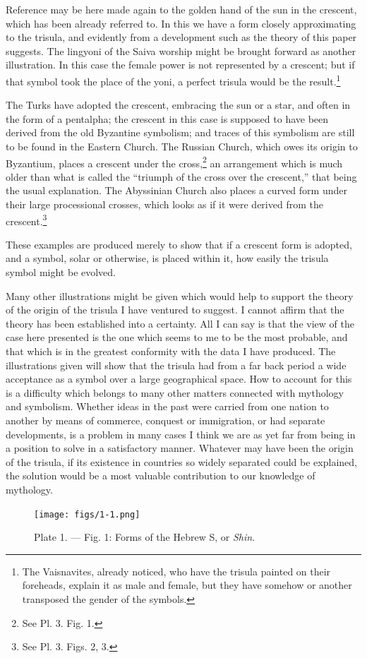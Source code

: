 \documentclass[a4paper, 11pt, oneside, english, landscape, twocolumn]{article}
\begin{document}
Reference may be here made again to the golden hand of the sun in the crescent, which has been already referred to. In this we have a form closely approximating to the trisula, and evidently from a development such as the theory of this paper suggests. The lingyoni of the Saiva worship might be brought forward as another illustration. In this case the female power is not represented by a crescent; but if that symbol took the place of the yoni, a perfect trisula would be the result.\footnote{The Vaisnavites, already noticed, who have the trisula painted on their foreheads, explain it as male and female, but they have somehow or another transposed the gender of the symbols.}

The Turks have adopted the crescent, embracing the sun or a star, and often in the form of a pentalpha; the crescent in this case is supposed to have been derived from the old Byzantine symbolism; and traces of this symbolism are still to be found in the Eastern Church. The Russian Church, which owes its origin to Byzantium, places a crescent under the cross,\footnote{See Pl. 3. Fig. 1.} an arrangement which is much older than what is called the ``triumph of the cross over the crescent,'' that being the usual explanation. The Abyssinian Church also places a curved form under their large processional crosses, which looks as if it were derived from the crescent.\footnote{See Pl. 3. Figs. 2, 3.}

These examples are produced merely to show that if a crescent form is adopted, and a symbol, solar or otherwise, is placed within it, how easily the trisula symbol might be evolved.

Many other illustrations might be given which would help to support the theory of the origin of the trisula I have ventured to suggest. I cannot affirm that the theory has been established into a certainty. All I can say is that the view of the case here presented is the one which seems to me to be the most probable, and that which is in the greatest conformity with the data I have produced. The illustrations given will show that the trisula had from a far back period a wide acceptance as a symbol over a large geographical space. How to account for this is a difficulty which belongs to many other matters connected with mythology and symbolism. Whether ideas in the past were carried from one nation to another by means of commerce, conquest or immigration, or had separate developments, is a problem in many cases I think we are as yet far from being in a position to solve in a satisfactory manner. Whatever may have been the origin of the trisula, if its existence in countries so widely separated could be explained, the solution would be a most valuable contribution to our knowledge of mythology.
\clearpage
\begin{figure}[H]
\centering
\texttt{[image: figs/1-1.png]}
\caption{Plate 1. --- Fig. 1: Forms of the Hebrew S, or \emph{Shin}.}
\end{figure}
\end{document}
